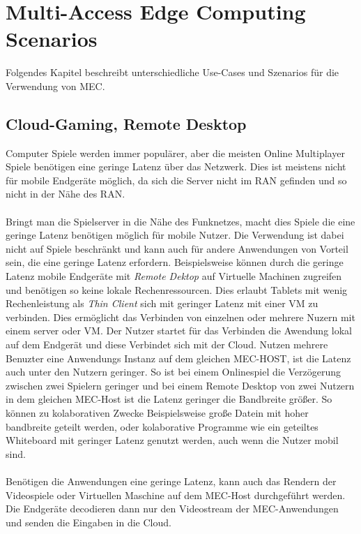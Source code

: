\documentclass[runningheads]{llncs}
\numberwithin{figure}{section}
\begin{document}
\section{Multi-Access Edge Computing Scenarios}
\label{sec:Anwendungen}
Folgendes Kapitel beschreibt unterschiedliche Use-Cases und Szenarios für die Verwendung von MEC.\cite{patelContributorHuaweiVice}
\subsection{Cloud-Gaming, Remote Desktop}
\label{subsec:Cloud-Gaming}
Computer Spiele werden immer populärer, aber die meisten Online Multiplayer Spiele benötigen eine geringe 
Latenz über das Netzwerk. Dies ist meistens nicht für mobile Endgeräte möglich, da sich die Server nicht im RAN gefinden und so
nicht in der Nähe des RAN.
\\
\\
Bringt man die Spielserver in die Nähe des Funknetzes, macht dies Spiele die eine geringe Latenz benötigen
möglich für mobile Nutzer. 
Die Verwendung ist dabei nicht auf Spiele beschränkt und kann auch für andere Anwendungen von Vorteil sein, 
die eine geringe Latenz erfordern. Beispielsweise können durch die geringe Latenz mobile Endgeräte mit \textit{Remote Dektop} auf
Virtuelle Machinen zugreifen und benötigen so keine lokale Rechenressourcen. Dies erlaubt Tablets mit wenig Rechenleistung als 
\textit{Thin Client} sich mit geringer Latenz mit einer VM zu verbinden.
Dies ermöglicht das Verbinden von einzelnen oder mehrere Nuzern mit einem server oder VM. Der Nutzer startet für das Verbinden
die Awendung lokal auf dem Endgerät und diese Verbindet sich mit der Cloud. Nutzen mehrere Benuzter eine Anwendungs Instanz auf dem 
gleichen MEC-HOST, ist die Latenz auch unter den Nutzern geringer. So ist bei einem Onlinespiel die Verzögerung zwischen zwei Spielern
geringer und bei einem Remote Desktop von zwei Nutzern in dem gleichen MEC-Host ist die Latenz geringer die Bandbreite größer. 
So können zu kolaborativen Zwecke Beispielsweise große Datein mit hoher bandbreite geteilt werden, oder kolaborative Programme wie
ein geteiltes Whiteboard mit geringer Latenz genutzt werden, auch wenn die Nutzer mobil sind.
\\
\\
Benötigen die Anwendungen eine geringe Latenz, kann auch das Rendern der Videospiele oder Virtuellen Maschine auf dem MEC-Host 
durchgeführt werden. Die Endgeräte decodieren dann nur den Videostream der MEC-Anwendungen und senden die Eingaben in die Cloud.
\end{document}
